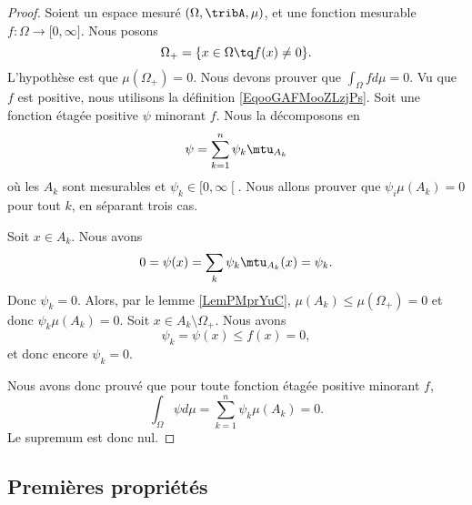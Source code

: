 \begin{proof}
	Soient un espace mesuré \( (\Omega, \tribA,\mu)\), et une fonction mesurable \(f \colon \Omega\to \mathopen[ 0 , \infty \mathclose]\). Nous posons
	\begin{equation}
		\Omega_+=\{ x\in \Omega\tq f(x)\neq 0 \}.
	\end{equation}
	L'hypothèse est que \( \mu(\Omega_+)=0\). Nous devons prouver que \( \int_{\Omega}fd\mu=0\). Vu que \( f\) est positive, nous utilisons la définition \ref{EqooGAFMooZLzjPs}. Soit une fonction étagée positive \( \psi\) minorant \( f\). Nous la décomposons en
	\begin{equation}
		\psi=\sum_{k=1}^n\psi_k\mtu_{A_k}
	\end{equation}
	où les \( A_k\) sont mesurables et \( \psi_k\in\mathopen[ 0 , \infty \mathclose[\). Nous allons prouver que \( \psi_i\mu(A_k)=0\) pour tout \( k\), en séparant trois cas.

	\begin{subproof}
		\spitem[Si \( A_k\cap \Omega_+=\emptyset\)]
		Soit \( x\in A_k\). Nous avons
		\begin{equation}
            0=\psi(x)=\sum_k\psi_k\mtu_{A_k}(x)=\psi_k.
		\end{equation}
		Donc \( \psi_k=0\).
		Alors, par le lemme \ref{LemPMprYuC}, \( \mu(A_k)\leq \mu(\Omega_+)=0\) et donc \( \psi_k\mu(A_k)=0\).
		Soit \( x\in A_k\setminus \Omega_+\). Nous avons
		\begin{equation}
			\psi_k=\psi(x)\leq f(x)=0,
		\end{equation}
		et donc encore \( \psi_k=0\).
	\end{subproof}
	Nous avons donc prouvé que pour toute fonction étagée positive minorant \( f\),
	\begin{equation}
		\int_{\Omega}\psi d\mu= \sum_{k=1}^n\psi_k\mu(A_k)=0.
	\end{equation}
	Le supremum est donc nul.
\end{proof}

\subsection{Premières propriétés}

